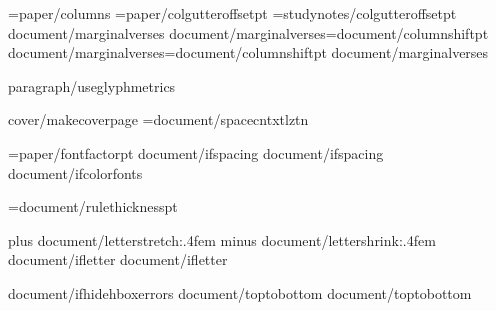 \BodyColumns={paper/columns}\def\mainBodyColumns{{{paper/columns}}}
\def\ColumnGutterFactor{{{document/colgutterfactor}}}
\ColumnGutterRuleSkip={paper/colgutteroffset}pt
\StudyColumnGutterRuleSkip={studynotes/colgutteroffset}pt
\def\StudyGutterFactor{{{studynotes/colgutterfactor}}}
{document/marginalverses}
{document/marginalverses}\columnshift={document/columnshift}pt
{document/marginalverses}\VerseBoxWidth={document/columnshift}pt
{document/marginalverses}\def\colshiftmode{{{document/marginalposn}}}
\def\PageFullFactor{{{document/pagefullfactor}}}
\def\BalanceThreshold{{{paper/bottomrag}}}

\def\LineSpaceBase{{{paragraph/linespacebase}}}
\def\LineSpacingFactor{{{paragraph/linespacingfactor}}}
\def\VerticalSpaceFactor{{1.0}}
{paragraph/useglyphmetrics}

{cover/makecoverpage}\NoTransparencyfalse
\XeTeXinterwordspaceshaping={document/spacecntxtlztn}

\FontSizeUnit={paper/fontfactor}pt
\def\regular{{"{document/fontregular}{document/script}"}}
\def\bold{{"{document/fontbold}{document/script}"}}
\def\italic{{"{document/fontitalic}{document/script}"}}
\def\bolditalic{{"{document/fontbolditalic}{document/script}"}}
{document/ifspacing}\def\SpaceStretchFactor{{{document/spacestretch}}}
{document/ifspacing}\def\SpaceShrinkFactor{{{document/spaceshrink}}}
{document/ifcolorfonts}\ColorFontsfalse

\def\UnderlineThickness{{{document/underlinethickness}em}}
\def\UnderlineLower{{{document/underlineposition}em}}
\RuleThickness={document/rulethickness}pt


\newskip\intercharskip \intercharskip=0pt plus {document/letterstretch:.4f}em minus {document/lettershrink:.4f}em
{document/ifletter}\def\intercharspace{{\leavevmode\nobreak\hskip\intercharskip}}
{document/ifletter}

{document/ifhidehboxerrors}\overfullrule=0pt
{document/toptobottom}     %
{document/toptobottom}\rotatetrue

